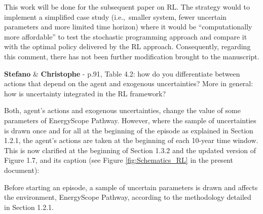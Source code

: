 \documentclass[12pt,a4paper]{article}
\def\ie{i.e.,\ }
\begin{document}
\noindent This work will be done for the subsequent paper on RL. The strategy would to implement a simplified case study (\ie smaller system, fewer uncertain parameters and more limited time horizon) where it would be ``computationally more affordable'' to test the stochastic programming approach and compare it with the optimal policy delivered by the RL approach. Consequently, regarding this comment, there has not been further modification brought to the manuscript.

\begin{mdframed}[style=comment] %
{\color{orange} \textbf{Stefano}} \& {\color{violet} \textbf{Christophe}} - p.91, Table 4.2: how do you differentiate between actions that depend on the agent and exogenous uncertainties? More in general: how is uncertainty integrated in the RL framework?
\end{mdframed}

\noindent Both, agent's actions and exogenous uncertainties, change the value of some parameters of EnergyScope Pathway. However, where the sample of uncertainties is drawn once and for all at the beginning of the episode as explained in Section 1.2.1, the agent's actions are taken at the beginning of each 10-year time window. This is now clarified {\color{blue}at the beginning of Section 1.3.2 and the updated version of Figure 1.7, and its caption} (see Figure \ref{fig:Schematics_RL} in the present document):

\begin{mdframed}[style=manuscript] %
Before starting an episode, a sample of uncertain parameters is drawn and affects the environment, EnergyScope Pathway, according to the methodology detailed in Section 1.2.1. 
\end{mdframed}
\end{document}
